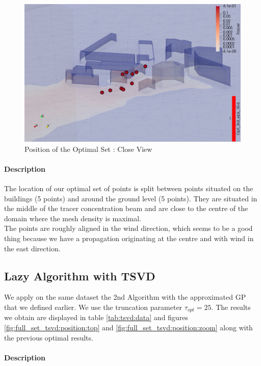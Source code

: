 \begin{figure}[h!]
\centering
\includegraphics[width=0.7\linewidth]{figures/MainOptimResults/alg3opteps10-6_zoom_screenshot}
\caption{Position of the Optimal Set : Close View}
\label{fig:full_set:position:zoom}
\end{figure}


\paragraph{Description}

The location of our optimal set of points is split between points situated on the buildings (5 points) and around the ground level (5 points). They are situated in the middle of the tracer concentration beam and are close to the centre of the domain where the mesh density is maximal. \\ 

The points are roughly aligned in the wind direction, which seems to be a good thing because we have a propagation originating at the centre and with wind in the east direction. 


\subsection{Lazy Algorithm with TSVD}

We apply on the same dataset the 2nd Algorithm with the approximated GP that we defined earlier. We use the truncation parameter $\tau_{opt} = 25$. The results we obtain are displayed in table \ref{tab:tsvd:data}
 and figures \ref{fig:full_set_tsvd:position:top} and \ref{fig:full_set_tsvd:position:zoom} along with the previous optimal results. 
 
 \paragraph{Description}

